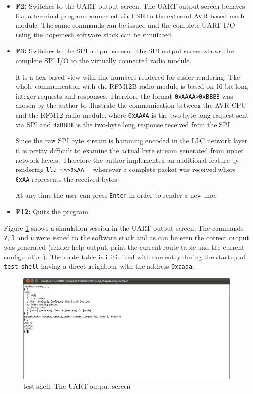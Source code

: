 \begin{itemize}
    \item \textbf{F2:} Switches to the UART output screen. The UART output screen behaves like a terminal program connected via USB to the external AVR based mesh module. The same commands can be issued and the complete UART I/O using the hopemesh software stack can be simulated.
    \item \textbf{F3:} Switches to the SPI output screen. The SPI output screen shows the complete SPI I/O to the virtually connected radio module.

It is a hex-based view with line numbers rendered for easier rendering. The whole communication with the RFM12B radio module is based on 16-bit long integer requests and responses. Therefore the format \texttt{0xAAAA>0xBBBB} was chosen by the author to illustrate the communication between the AVR CPU and the RFM12 radio module, where \texttt{0xAAAA} is the two-byte long request sent via SPI and \texttt{0xBBBB} is the two-byte long response received from the SPI.

Since the raw SPI byte stream is hamming encoded in the LLC network layer it is pretty difficult to examine the actual byte stream generated from upper network layers. Therefore the author implemented an additional feature by rendering \texttt{llc\_rx>0xAA\_\_} whenever a complete packet was received where \texttt{0xAA} represents the received bytes.

At any time the user can press \texttt{Enter} in order to render a new line.
    \item \textbf{F12:} Quits the program
\end{itemize}

Figure \ref{fig:test-shell1} shows a simulation session in the UART output screen. The commands \texttt{?}, \texttt{l} and \texttt{c} were issued to the software stack and as can be seen the correct output was generated (render help output, print the current route table and the current configuration). The route table is initialized with one entry during the startup of \texttt{test-shell} having a direct neighbour with the address \texttt{0xaaaa}.

\begin{figure}[H]
\centering
\includegraphics[width=\textwidth]{figures/research-shell1.png}
\caption{test-shell: The UART output screen}
\label{fig:test-shell1}
\end{figure}

